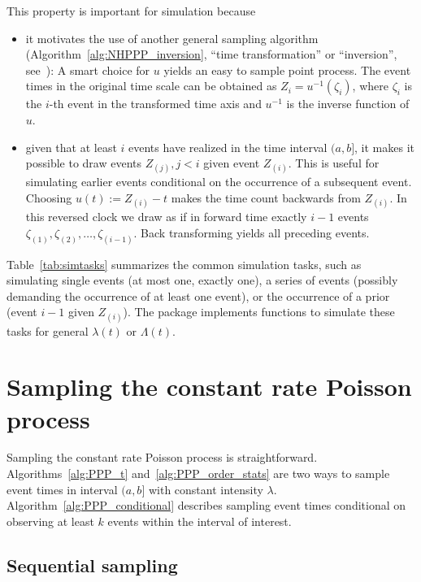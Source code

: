\documentclass[article,nojss]{jss}\usepackage[]{graphicx}\usepackage[]{xcolor}
\begin{document}
This property is important for simulation because
\begin{itemize}
    \item it motivates the use of another general sampling algorithm (Algorithm~\ref{alg:NHPPP_inversion}, ``time transformation'' or ``inversion'', see~\cite{Cinlar1975inversion}): A smart choice for $u$ yields an easy to sample point process. The event times in the original time scale can be obtained as $Z_i = u^{-1}(\zeta_i)$, where $\zeta_i$ is the $i$-th event in the transformed time axis and $u^{-1}$ is the inverse function of $u$.
    \item given that at least $i$ events have realized in the time interval $(a, b]$, it makes it possible to draw events ${Z_{(j)}, j<i}$ given event $Z_{(i)}$. This is useful for simulating earlier events conditional on the occurrence of a subsequent event. Choosing $u(t) := Z_{(i)} - t$ makes the time count backwards from $Z_{(i)}$. In this reversed clock we draw as if in forward time exactly $i-1$ events $\zeta_{(1)}, \zeta_{(2)}, \dots, \zeta_{(i-1)}$. Back transforming yields all preceding events.
\end{itemize}

Table~\ref{tab:simtasks} summarizes the common simulation tasks, such as simulating single events (at most one, exactly one), a series of events (possibly demanding the occurrence of at least one event), or the occurrence of a prior (event $i-1$ given $Z_{(i)}$). The  package implements functions to simulate these tasks for general $\lambda(t)$ or $\Lambda(t)$.



\section{Sampling the constant rate Poisson process}\label{sec:sample-ppp}

Sampling the constant rate Poisson process is straightforward. Algorithms~\ref{alg:PPP_t} and~\ref{alg:PPP_order_stats} are two ways to sample event times in interval $(a, b]$ with constant intensity $\lambda$. Algorithm~\ref{alg:PPP_conditional} describes sampling event times conditional on observing at least $k$ events within the interval of interest.


\subsection{Sequential sampling}\label{sec:PPP_t}
\end{document}
